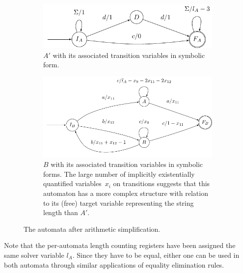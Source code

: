 \begin{figure}[ht]
    \centering 
  \begin{subfigure}{0.42\textwidth}
    \centering
    \includegraphics[width=\textwidth]{a_annotated}
    \vspace*{5ex}
    \caption{ $A'$ with its associated transition variables in symbolic
    form.}\label{fig:aut_a_annotated}
    \vspace*{1.9ex}
  \end{subfigure}\hfill%
  \begin{subfigure}{0.54\textwidth}
    \centering
    \includegraphics[width=\textwidth]{b_annotated}
    \caption{$B$ with its associated transition variables in symbolic forms.
    The large number of implicitly existentially quantified
    variables~$x_i$ on
    transitions  suggests that this automaton has a more complex structure
    with relation to its (free) target variable representing the string length
    than $A'$. %
  }\label{fig:aut_b_annotated}
  \end{subfigure}
  \caption{The automata after arithmetic simplification.}\label{fig:propagated}
\end{figure}


Note that the per-automata length counting registers have been assigned the same
solver variable $l_A$. Since they have to be equal, either one can be used in
both automata through similar applications of equality elimination rules.

